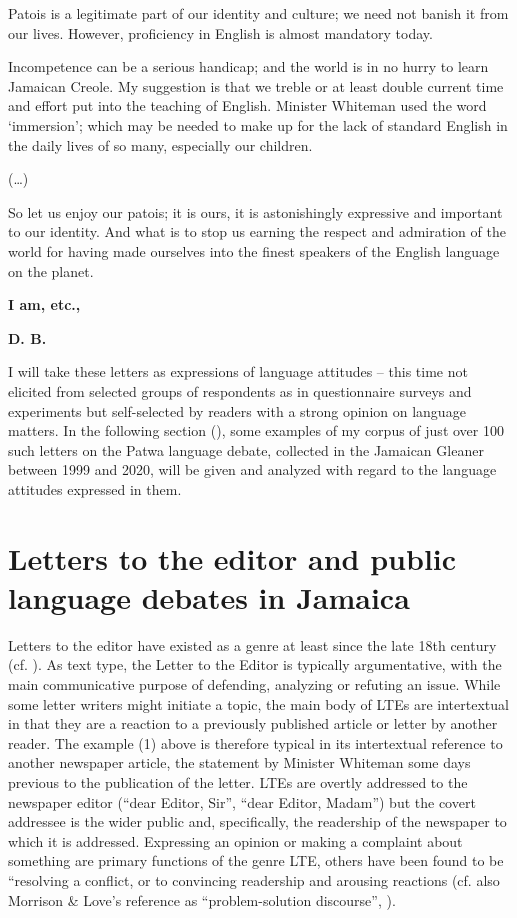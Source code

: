 \documentclass[output=paper,colorlinks,citecolor=brown]{langscibook}
\begin{document}
Patois is a legitimate part of our identity and culture; we need not banish it from our lives. However, proficiency in English is almost mandatory today.

Incompetence can be a serious handicap; and the world is in no hurry to learn Jamaican Creole. My suggestion is that we treble or at least double current time and effort put into the teaching of English. Minister Whiteman used the word ‘immersion'; which may be needed to make up for the lack of standard English in the daily lives of so many, especially our children.

(…)

So let us enjoy our patois; it is ours, it is astonishingly expressive and important to our identity. And what is to stop us earning the respect and admiration of the world for having made ourselves into the finest speakers of the English language on the planet.

\textbf{I am, etc.,}

\textbf{D. B.}
\z

I will take these letters as expressions of language attitudes -- this time not elicited from selected groups of respondents as in questionnaire surveys and experiments but self-selected by readers with a strong opinion on language matters. In the following section (), some examples of my corpus of just over 100 such letters on the Patwa language debate, collected in the Jamaican Gleaner between 1999 and 2020, will be given and analyzed with regard to the language attitudes expressed in them.

\section{Letters to the editor and public language debates in Jamaica}\label{sec:muehleisen:4}

Letters to the editor have existed as a genre at least since the late 18th century (cf. \citealt{sturiale2016}). As text type, the Letter to the Editor is typically argumentative, with the main communicative purpose of defending, analyzing or refuting an issue. While some letter writers might initiate a topic, the main body of LTEs are intertextual in that they are a reaction to a previously published article or letter by another reader. The example (1) above is therefore typical in its intertextual reference to another newspaper article, the statement by Minister Whiteman some days previous to the publication of the letter. LTEs are overtly addressed to the newspaper editor (“dear Editor, Sir”, “dear Editor, Madam”) but the covert addressee is the wider public and, specifically, the readership of the newspaper to which it is addressed. Expressing an opinion or making a complaint about something are primary functions of the genre LTE, others have been found to be “resolving a conflict, or to convincing readership and arousing reactions (cf. also Morrison \& Love’s reference as “problem-solution discourse”, \citeyear[50]{morrison_love1996}).
\end{document}
